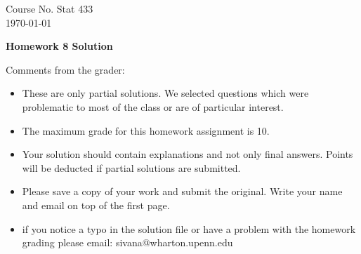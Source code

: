 \documentclass[10pt,a4paper]{article}
\begin{document}
\begin{flushleft}
Course No. Stat 433 \\
\today
\end{flushleft}

\begin{center}
{\Large{\bf  Homework 8 Solution}}
\end{center}

\textcolor[rgb]{0.98,0.00,0.00}{Comments from the grader:}
\begin{itemize}

    \item \textcolor[rgb]{0.98,0.00,0.00}{These are only partial solutions.  We selected
    questions which were problematic to most of the class or are of particular interest.}
    \item \textcolor[rgb]{0.98,0.00,0.00}{The maximum grade for this homework assignment is 10.}
    \item \textcolor[rgb]{0.98,0.00,0.00}{Your solution should contain explanations and not only
    final answers. Points will be deducted if partial solutions
    are submitted.}
    \item \textcolor[rgb]{0.98,0.00,0.00}{Please save a copy of your work and submit the original.
    Write your name and email on top of the first page.}
    \item \textcolor[rgb]{0.98,0.00,0.00}{if you notice a typo in the solution file or have a problem with the homework
    grading please email: sivana@wharton.upenn.edu
}
\end{itemize}
\end{document}
